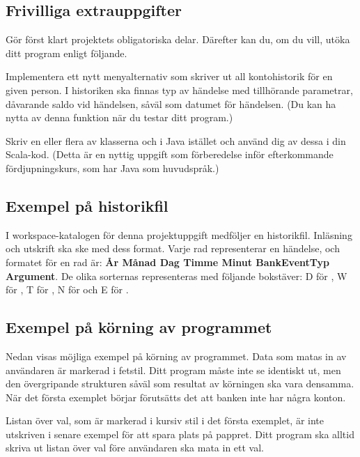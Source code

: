 \subsection{Frivilliga extrauppgifter}

Gör först klart projektets obligatoriska delar. Därefter kan du, om du vill, utöka ditt program enligt följande.

\Task Implementera ett nytt menyalternativ som skriver ut all kontohistorik för en given person. I historiken ska finnas typ av händelse med tillhörande parametrar, dåvarande saldo vid händelsen, såväl som datumet för händelsen. (Du kan ha nytta av denna funktion när du testar ditt program.)

\Task Skriv en eller flera av klasserna  och  i Java istället och använd dig av dessa i din Scala-kod. (Detta är en nyttig uppgift som förberedelse inför efterkommande fördjupningskurs, som har Java som huvudspråk.)

\subsection{Exempel på historikfil}

I workspace-katalogen för denna projektuppgift medföljer en historikfil. Inläsning och utskrift ska ske med dess format. Varje rad representerar en händelse, och formatet för en rad är: \textbf{År  Månad  Dag  Timme  Minut  BankEventTyp  Argument}. De olika sorternas  representeras med följande bokstäver: D för , W för , T för , N för  och E för .

\subsection{Exempel på körning av programmet}\label{bank:exempel}

Nedan visas möjliga exempel på körning av programmet. Data som matas in av användaren är markerad i fetstil.
Ditt program måste inte se identiskt ut, men den övergripande strukturen såväl som resultat av körningen ska vara densamma.
När det första exemplet börjar förutsätts det att banken inte har några konton.

Listan över val, som är markerad i kursiv stil i det första exemplet, är inte utskriven i senare exempel för att spara plats på pappret. Ditt program ska alltid skriva ut listan över val före användaren ska mata in ett val.

